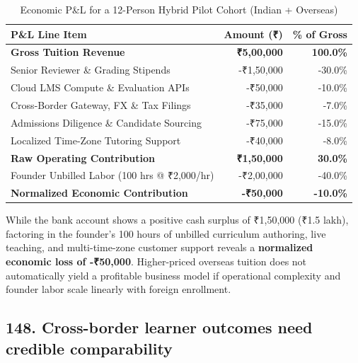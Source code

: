 \begin{table}[htbp]
\centering
\small
\caption{Economic P\&L for a 12-Person Hybrid Pilot Cohort (Indian + Overseas)}
\label{tab:bayes_cohort_pnl}
\begin{tabularx}{\columnwidth}{p{4.2cm} r r}
\toprule
\textbf{P\&L Line Item} & \textbf{Amount (₹)} & \textbf{\% of Gross} \\
\midrule
\textbf{Gross Tuition Revenue} & \textbf{₹5,00,000} & \textbf{100.0\%} \\
Senior Reviewer \& Grading Stipends & -₹1,50,000 & -30.0\% \\
Cloud LMS Compute \& Evaluation APIs & -₹50,000 & -10.0\% \\
Cross-Border Gateway, FX \& Tax Filings & -₹35,000 & -7.0\% \\
Admissions Diligence \& Candidate Sourcing & -₹75,000 & -15.0\% \\
Localized Time-Zone Tutoring Support & -₹40,000 & -8.0\% \\
\midrule
\textbf{Raw Operating Contribution} & \textbf{₹1,50,000} & \textbf{30.0\%} \\
Founder Unbilled Labor (100 hrs @ ₹2,000/hr) & -₹2,00,000 & -40.0\% \\
\midrule
\textbf{Normalized Economic Contribution} & \textbf{-₹50,000} & \textbf{-10.0\%} \\
\bottomrule
\end{tabularx}
\end{table}

While the bank account shows a positive cash surplus of ₹1,50,000 (₹1.5 lakh), factoring in the founder's 100 hours of unbilled curriculum authoring, live teaching, and multi-time-zone customer support reveals a \textbf{normalized economic loss of -₹50,000}. Higher-priced overseas tuition does not automatically yield a profitable business model if operational complexity and founder labor scale linearly with foreign enrollment.

\subsection{148. Cross-border learner outcomes need credible comparability}


